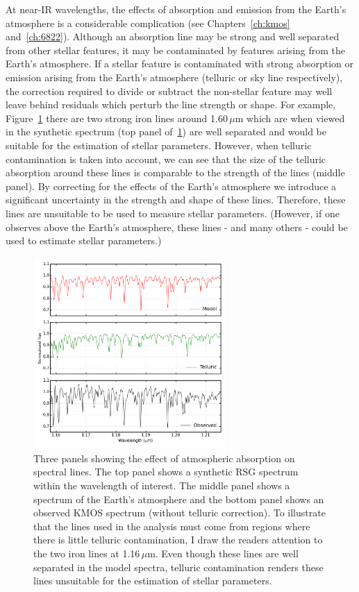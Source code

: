 At near-IR wavelengths, the effects of absorption and emission from the Earth's atmosphere is a considerable complication (see Chapters~\ref{ch:kmos} and~\ref{ch:6822}).
Although an absorption line may be strong and well separated from other stellar features, it may be contaminated by features arising from the Earth's atmosphere.
If a stellar feature is contaminated with strong absorption or emission arising from the Earth's atmosphere (telluric or sky line respectively), the correction required to divide or subtract the non-stellar feature may well leave behind residuals which perturb the line strength or shape.
For example, Figure~\ref{fig:Felines} there are two strong iron lines around 1.60\,$\mu$m which are when viewed in the synthetic spectrum (top panel of~\ref{fig:Felines}) are well separated and would be suitable for the estimation of stellar parameters.
However, when telluric contamination is taken into account, we can see that the size of the telluric absorption around these lines is comparable to the strength of the lines (middle panel).
By correcting for the effects of the Earth's atmosphere we introduce a significant uncertainty in the strength and shape of these lines.
Therefore, these lines are unsuitable to be used to measure stellar parameters. (However, if one observes above the Earth's atmosphere, these lines - and many others - could be used to estimate stellar parameters.)

\begin{figure}
 \centering
\includegraphics[width=0.65\textwidth]{JAnal/tell-correction}
\caption{
Three panels showing the effect of atmospheric absorption on spectral lines.
The top panel shows a synthetic RSG spectrum within the wavelength of interest.
The middle panel shows a spectrum of the Earth's atmosphere and
the bottom panel shows an observed KMOS spectrum (without telluric correction).
To illustrate that the lines used in the analysis must come from regions where there is little telluric contamination, I draw the readers attention to the two iron lines at 1.16\,$\mu$m.
Even though these lines are well separated in the model spectra, telluric contamination renders these lines unsuitable for the estimation of  stellar parameters.
\label{fig:Felines}
         }
\end{figure}

